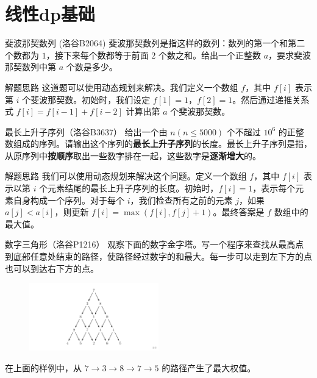 \documentclass{beamer}
\begin{document}
\section{线性dp基础}

\begin{frame}{斐波那契数列 (洛谷B2064)}
    斐波那契数列是指这样的数列：数列的第一个和第二个数都为 $1$，接下来每个数都等于前面 $2$ 个数之和。给出一个正整数 $a$，要求斐波那契数列中第 $a$ 个数是多少。
\end{frame}

\begin{frame}{解题思路}
    这道题可以使用动态规划来解决。我们定义一个数组 $f$，其中 $f[i]$ 表示第 $i$ 个斐波那契数。初始时，我们设定 $f[1] = 1$，$f[2] = 1$。然后通过递推关系式 $f[i] = f[i-1] + f[i-2]$ 计算出第 $a$ 个斐波那契数。
\end{frame}

\begin{frame}{最长上升子序列（洛谷B3637）}
    给出一个由 $n(n\le 5000)$ 个不超过 $10^6$ 的正整数组成的序列。请输出这个序列的\textbf{最长上升子序列}的长度。最长上升子序列是指，从原序列中\textbf{按顺序}取出一些数字排在一起，这些数字是\textbf{逐渐增大}的。
\end{frame}

\begin{frame}{解题思路}
    我们可以使用动态规划来解决这个问题。定义一个数组 $f$，其中 $f[i]$ 表示以第 $i$ 个元素结尾的最长上升子序列的长度。初始时，$f[i] = 1$，表示每个元素自身构成一个序列。对于每个 $i$，我们检查所有之前的元素 $j$，如果 $a[j] < a[i]$，则更新 $f[i] = \max(f[i], f[j] + 1)$。最终答案是 $f$ 数组中的最大值。
\end{frame}

\begin{frame}{数字三角形（洛谷P1216）}
    观察下面的数字金字塔。写一个程序来查找从最高点到底部任意处结束的路径，使路径经过数字的和最大。每一步可以走到左下方的点也可以到达右下方的点。
    \begin{figure}
        \centering
        \includegraphics[width=0.5\textwidth]{./ex.png}
    \end{figure}
    在上面的样例中，从 $7 \rightarrow 3 \rightarrow 8 \rightarrow 7 \rightarrow 5$ 的路径产生了最大权值。
\end{frame}
\end{document}
